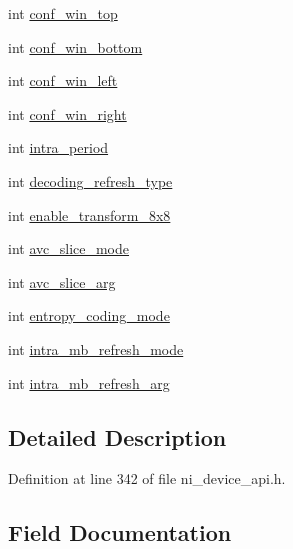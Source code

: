 \begin{DoxyCompactItemize}
\begin{tabbing}
\end{tabbing}\item 
int \mbox{\hyperlink{struct__ni__h265__encoder__params_a28675a27ecf8f69841385808fccbe5d2}{conf\+\_\+win\+\_\+top}}
\item 
int \mbox{\hyperlink{struct__ni__h265__encoder__params_ae87a12f694772e7d335ab7a101e6e1ee}{conf\+\_\+win\+\_\+bottom}}
\item 
int \mbox{\hyperlink{struct__ni__h265__encoder__params_a52d9275a8bba85c0e297611232e31bd8}{conf\+\_\+win\+\_\+left}}
\item 
int \mbox{\hyperlink{struct__ni__h265__encoder__params_a5e76f1f86e2dda6acc7bf512ecb5398f}{conf\+\_\+win\+\_\+right}}
\item 
int \mbox{\hyperlink{struct__ni__h265__encoder__params_a1e0be905fc80736667643088f1def90e}{intra\+\_\+period}}
\item 
int \mbox{\hyperlink{struct__ni__h265__encoder__params_a3d4a3cbebef9410eb0d41a0ea2ddf6a0}{decoding\+\_\+refresh\+\_\+type}}
\item 
int \mbox{\hyperlink{struct__ni__h265__encoder__params_a188de70352dee96bc41527e46f7dd3ea}{enable\+\_\+transform\+\_\+8x8}}
\item 
int \mbox{\hyperlink{struct__ni__h265__encoder__params_abe5cbbd0936da157c4f4dd7ef4dabbca}{avc\+\_\+slice\+\_\+mode}}
\item 
int \mbox{\hyperlink{struct__ni__h265__encoder__params_abc9a7f2ea1bea20a7fbb59fe200daf3a}{avc\+\_\+slice\+\_\+arg}}
\item 
int \mbox{\hyperlink{struct__ni__h265__encoder__params_aa1a95059daa21bc2c8fac01a862436ed}{entropy\+\_\+coding\+\_\+mode}}
\item 
int \mbox{\hyperlink{struct__ni__h265__encoder__params_a2adb9c9df8b31513a54d04e4562a145f}{intra\+\_\+mb\+\_\+refresh\+\_\+mode}}
\item 
int \mbox{\hyperlink{struct__ni__h265__encoder__params_a0c16a48413703d6d912dd8c5c4f97eef}{intra\+\_\+mb\+\_\+refresh\+\_\+arg}}
\end{DoxyCompactItemize}


\subsection{Detailed Description}


Definition at line 342 of file ni\+\_\+device\+\_\+api.\+h.



\subsection{Field Documentation}
\mbox{\label{struct__ni__h265__encoder__params_abc9a7f2ea1bea20a7fbb59fe200daf3a}} 
